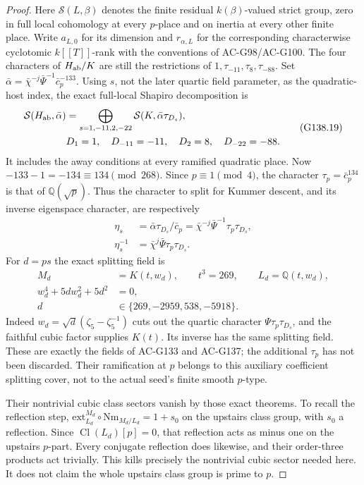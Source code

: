 \begin{proof}
Here \(\mathcal S(L,\beta)\) denotes the finite residual
\(k(\beta)\)-valued strict group, zero in full local
cohomology at every \(p\)-place and on inertia at every
other finite place.  Write \(a_{L,0}\) for its dimension
and \(r_{\alpha,L}\) for the corresponding characterwise
cyclotomic \(k[[T]]\)-rank with the conventions of
AC-G98/AC-G100.
The four characters of \(H_{\rm ab}/K\) are still the restrictions
of \(1,\tau_{-11},\tau_8,\tau_{-88}\).
Set
\(\bar\alpha=\bar\chi^{-j}\bar\Psi^{-1}\bar c_p^{-133}\).
Using \(s\), not the later quartic field parameter, as the
quadratic-host index, the exact full-local Shapiro decomposition is
\[
 \begin{aligned}
 \mathcal S(H_{\rm ab},\bar\alpha)
   &=\bigoplus_{s=1,-11,2,-22}
                    \mathcal S(K,\bar\alpha\tau_{D_s}),\\
 &D_1=1,\quad D_{-11}=-11,\quad D_2=8,\quad D_{-22}=-88 .
 \end{aligned}
 \tag{G138.19}
\]
It includes the away conditions at every ramified quadratic place.
Now \(-133-1=-134\equiv134\pmod{268}\).
Since \(p\equiv1\pmod4\), the character
\(\tau_p=\bar c_p^{134}\) is that of \(\mathbb Q(\sqrt p)\).
Thus the character to split for Kummer descent, and its inverse
eigenspace character, are respectively
\[
 \begin{aligned}
 \eta_s&=\bar\alpha\tau_{D_s}/\bar c_p
       =\bar\chi^{-j}\bar\Psi^{-1}\tau_p\tau_{D_s},\\
 \eta_s^{-1}&=\bar\chi^j\bar\Psi\tau_p\tau_{D_s}.
 \end{aligned}
\]
For \(d=ps\) the exact splitting field is
\[
 \begin{aligned}
 M_d&=K(t,w_d),\qquad t^3=269,\qquad L_d=\mathbb Q(t,w_d),\\
 w_d^4+5dw_d^2+5d^2&=0,\\
 d&\in\{269,-2959,538,-5918\}.
 \end{aligned}
 \tag{G138.20}
\]
Indeed \(w_d=\sqrt d(\zeta_5-\zeta_5^{-1})\) cuts out the
quartic character \(\Psi\tau_p\tau_{D_s}\), and the faithful
cubic factor supplies \(K(t)\).  Its inverse has the same
splitting field.  These are exactly the fields of AC-G133 and
AC-G137; the additional \(\tau_p\) has not been discarded.
Their ramification at \(p\) belongs to this auxiliary coefficient
splitting cover, not to the actual seed's finite smooth \(p\)-type.

Their nontrivial cubic class sectors vanish by those exact
theorems.  To recall the reflection step,
\(\mathrm{ext}_{L_d}^{M_d}\circ\mathrm{Nm}_{M_d/L_d}=1+s_0\)
on the upstairs class group, with \(s_0\) a reflection.
Since \(\operatorname{Cl}(L_d)[p]=0\), that reflection acts
as minus one on the upstairs \(p\)-part.
Every conjugate reflection does likewise, and their order-three
products act trivially.  This kills precisely the nontrivial
cubic sector needed here.  It does not claim the whole upstairs
class group is prime to \(p\).


\end{proof}

